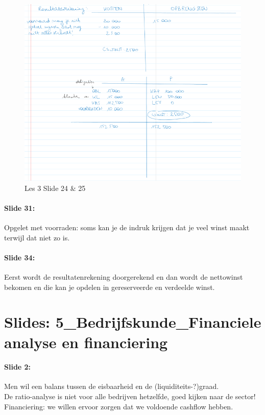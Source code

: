 \documentclass[10pt,a4paper]{report}
\begin{document}
\begin{figure}[h!]
\centering
\includegraphics[width=120mm]{Les03_06.png}
\caption{Les 3 Slide 24 $\&$ 25} 
\label{les03_06}
\end{figure}

\paragraph{Slide 31:} Opgelet met voorraden: soms kan je de indruk krijgen dat je veel winst maakt terwijl dat niet zo is.

\paragraph{Slide 34:} Eerst wordt de resultatenrekening doorgerekend en dan wordt de nettowinst bekomen en die kan je opdelen in gereserveerde en verdeelde winst.

\section{Slides: 5\_Bedrijfskunde\_Financiele analyse en financiering}

\paragraph{Slide 2:} Men wil een balans tussen de eisbaarheid en de (liquiditeits-?)graad.\\
De ratio-analyse is niet voor alle bedrijven hetzelfde, goed kijken naar de sector!\\
Financiering: we willen ervoor zorgen dat we voldoende cashflow hebben.
\end{document}
